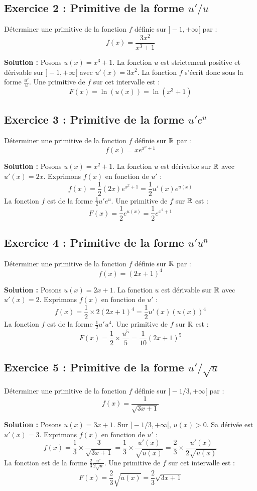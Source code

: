 \subsection*{Exercice 2 : Primitive de la forme $u'/u$}
Déterminer une primitive de la fonction $f$ définie sur $]-1, +\infty[$ par :
\[
f(x) = \frac{3x^2}{x^3 + 1}
\]

\textbf{Solution :}
Posons $u(x) = x^3 + 1$. La fonction $u$ est strictement positive et dérivable sur $]-1, +\infty[$ avec $u'(x) = 3x^2$.
La fonction $f$ s'écrit donc sous la forme $\frac{u'}{u}$.
Une primitive de $f$ sur cet intervalle est :
\[
F(x) = \ln(u(x)) = \ln(x^3 + 1)
\]

\subsection*{Exercice 3 : Primitive de la forme $u' e^u$}
Déterminer une primitive de la fonction $f$ définie sur $\mathbb{R}$ par :
\[
f(x) = x e^{x^2 + 1}
\]

\textbf{Solution :}
Posons $u(x) = x^2 + 1$. La fonction $u$ est dérivable sur $\mathbb{R}$ avec $u'(x) = 2x$.
Exprimons $f(x)$ en fonction de $u'$ :
\[
f(x) = \frac{1}{2} (2x) e^{x^2 + 1} = \frac{1}{2} u'(x) e^{u(x)}
\]
La fonction $f$ est de la forme $\frac{1}{2} u' e^u$.
Une primitive de $f$ sur $\mathbb{R}$ est :
\[
F(x) = \frac{1}{2} e^{u(x)} = \frac{1}{2} e^{x^2 + 1}
\]

\subsection*{Exercice 4 : Primitive de la forme $u' u^n$}
Déterminer une primitive de la fonction $f$ définie sur $\mathbb{R}$ par :
\[
f(x) = (2x + 1)^4
\]

\textbf{Solution :}
Posons $u(x) = 2x + 1$. La fonction $u$ est dérivable sur $\mathbb{R}$ avec $u'(x) = 2$.
Exprimons $f(x)$ en fonction de $u'$ :
\[
f(x) = \frac{1}{2} \times 2 (2x + 1)^4 = \frac{1}{2} u'(x) (u(x))^4
\]
La fonction $f$ est de la forme $\frac{1}{2} u' u^4$.
Une primitive de $f$ sur $\mathbb{R}$ est :
\[
F(x) = \frac{1}{2} \times \frac{u^5}{5} = \frac{1}{10} (2x + 1)^5
\]

\subsection*{Exercice 5 : Primitive de la forme $u'/\sqrt{u}$}
Déterminer une primitive de la fonction $f$ définie sur $]-1/3, +\infty[$ par :
\[
f(x) = \frac{1}{\sqrt{3x + 1}}
\]

\textbf{Solution :}
Posons $u(x) = 3x + 1$. Sur $]-1/3, +\infty[$, $u(x) > 0$. Sa dérivée est $u'(x) = 3$.
Exprimons $f(x)$ en fonction de $u'$ :
\[
f(x) = \frac{1}{3} \times \frac{3}{\sqrt{3x+1}} = \frac{1}{3} \times \frac{u'(x)}{\sqrt{u(x)}} = \frac{2}{3} \times \frac{u'(x)}{2\sqrt{u(x)}}
\]
La fonction est de la forme $\frac{2}{3} \frac{u'}{2\sqrt{u}}$.
Une primitive de $f$ sur cet intervalle est :
\[
F(x) = \frac{2}{3} \sqrt{u(x)} = \frac{2}{3} \sqrt{3x + 1}
\]

